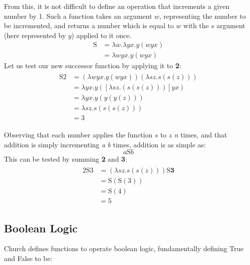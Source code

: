 \documentclass[Master.tex]{subfiles}
\begin{document}
From this, it is not difficult to define an operation that increments a given number by 1. Such a function takes an argument $w$, representing the number to be incremented, and returns a number which is equal to $w$ with the $s$ argument (here represented by $y$) applied to it once.
\cite{rojas2015lambdatutorial}
\begin{equation*}
\begin{aligned}
\bm{\mathrm{S}} &= \lambda w.\lambda yx.y(wyx)\\
&= \lambda wyx.y(wyx)
\end{aligned}
\end{equation*}
Let us test our new successor function by applying it to \textbf{2}:
\begin{gather*}
\begin{aligned}
\bm{\mathrm{S2}} &= (\lambda wyx.y(wyx)) (\lambda sz.s(s(z)))\\
&= \lambda yx.y([\lambda sz.(s(s(z)))]yx)\\
&= \lambda yx.y(y(y(z)))\\
&= \lambda sz.s(s(s(z)))\\
&= \bm{\mathrm{3}}
\end{aligned}
\end{gather*}

Observing that each number applies the function $s$ to $z$ \textit{n} times, and that addition is simply incrementing \textit{a} \textit{b} times, addition is as simple as:
\cite{rojas2015lambdatutorial}
\begin{equation*}
a\bm{\mathrm{S}}b	
\end{equation*}
This can be tested by summing \textbf{2} and \textbf{3}:
\begin{gather*}
\begin{aligned}
\bm{\mathrm{2S3}} &= (\lambda sz.s(s(z))) \bm{\mathrm{S}} \bm{\textrm{3}}\\
&= \bm{\mathrm{S}} (\bm{\mathrm{S}} (\bm{\mathrm{3}}))\\
&= \bm{\mathrm{S}} (\bm{\mathrm{4}})\\
&= \bm{\mathrm{5}}
\end{aligned}
\end{gather*}

\subsection{Boolean Logic}

Church defines functions to operate boolean logic, fundamentally defining True and False to be:
\cite{rojas2015lambdatutorial}
    
\end{document}
